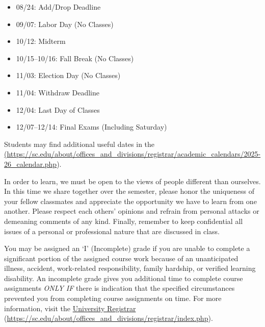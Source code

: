 \documentclass[11pt,letterpaper]{article}
\begin{document}

	\begin{itemize}
	\item 08/24: Add/Drop Deadline
	\item 09/07: Labor Day (No Classes)
	\item 10/12: Midterm
	\item 10/15--10/16: Fall Break (No Classes)
	\item 11/03: Election Day (No Classes)
	\item 11/04: Withdraw Deadline
	\item 12/04: Last Day of Classes
	\item 12/07--12/14: Final Exams (Including Saturday)
	\end{itemize}

Students may find additional useful dates in the \href{https://sc.edu/about/offices\_and\_divisions/registrar/academic\_calendars/2025-26\_calendar.php} (\url{https://sc.edu/about/offices\_and\_divisions/registrar/academic\_calendars/2025-26\_calendar.php}). 
\sectionbreak




In order to learn, we must be open to the views of people different than ourselves. In this time we share together over the semester, please honor the uniqueness of your fellow classmates and appreciate the opportunity we have to learn from one another. Please respect each others' opinions and refrain from personal attacks or demeaning comments of any kind. Finally, remember to keep confidential all issues of a personal or professional nature that are discussed in class. \sectionbreak




You may be assigned an `I' (Incomplete) grade if you are unable to complete a significant portion of the assigned course work because of an unanticipated illness, accident, work-related responsibility, family hardship, or verified learning disability. An incomplete grade gives you additional time to complete course assignments {\itshape ONLY IF} there is indication that the specified circumstances prevented you from completing course assignments on time. For more information, visit the \href{https://sc.edu/about/offices\_and\_divisions/registrar/index.php}{University Registrar} (\url{https://sc.edu/about/offices\_and\_divisions/registrar/index.php}). \sectionbreak
\end{document}
